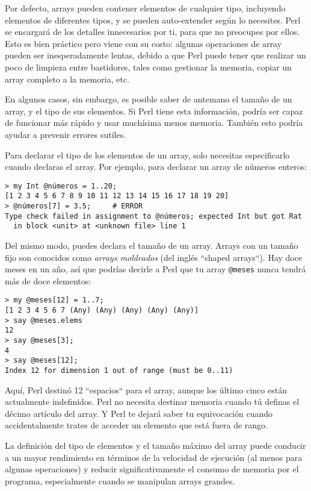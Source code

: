 Por defecto, arrays pueden contener elementos de cualquier
tipo, incluyendo elementos de diferentes tipos, y se pueden
auto-extender según lo necesites. Perl se encargará de 
los detalles innecesarios por ti, para que no preocupes
por ellos. Esto es bien práctico pero viene con su costo:
algunas operaciones de array pueden ser inesperadamente lentas,
debido a que Perl puede tener que realizar un poco de limpieza
entre bastidores, tales como gestionar la memoria, copiar un array 
completo a la memoria, etc.  

En algunos casos, sin embargo, es posible saber de antemano
el tamaño de un array, y el tipo de sus elementos. Si Perl
tiene esta información, podría ser capaz de funcionar más
rápido y usar muchísima menos memoria. También esto podría 
ayudar a prevenir errores sutiles.

Para declarar el tipo de los elementos de un array, solo
necesitas especificarlo cuando declaras el array. Por ejemplo,
para declarar un array de números enteros:

\begin{lstlisting}
> my Int @números = 1..20;
[1 2 3 4 5 6 7 8 9 10 11 12 13 14 15 16 17 18 19 20]
> @números[7] = 3.5;     # ERROR
Type check failed in assignment to @números; expected Int but got Rat
  in block <unit> at <unknown file> line 1
\end{lstlisting}
%

Del mismo modo, puedes declara el tamaño de un array. Arrays 
con un tamaño fijo son conocidos como \emph{arrays moldeados} 
(del inglés ``shaped arrays``). Hay doce meses en un año, así que 
podrías decirle a Perl que tu array \verb|@meses| nunca tendrá 
más de doce elementos:
\begin{lstlisting}
> my @meses[12] = 1..7;
[1 2 3 4 5 6 7 (Any) (Any) (Any) (Any) (Any)]
> say @meses.elems
12
> say @meses[3];
4
> say @meses[12];
Index 12 for dimension 1 out of range (must be 0..11)
\end{lstlisting}
%

Aquí, Perl destinó 12 ``espacios`` para el array, aunque los
último cinco están actualmente indefinidos. Perl no necesita
destinar memoria cuando tú definas el décimo artículo del array.
Y Perl te dejará saber tu equivocación cuando accidentalmente 
trates de acceder un elemento que está fuera de rango.

La definición del tipo de elementos y el tamaño máximo del array
puede conducir a un mayor rendimiento en términos de la
velocidad de ejecución (al menos para algunas operaciones) y 
reducir significativamente el consumo de memoria por el 
programa, especialmente cuando se manipulan arrays grandes.

